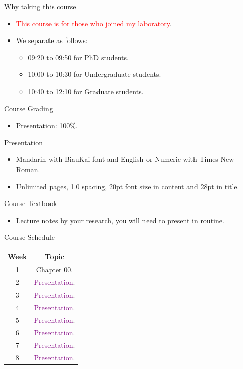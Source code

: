 \documentclass{beamer}
\begin{document}
\begin{frame}{Why taking this course}
\begin{itemize}
\item \textcolor{red}{This course is for those who joined my laboratory}.
\item We separate as follows:
\begin{itemize}
\item 09:20 to 09:50 for PhD students.
\item 10:00 to 10:30 for Undergraduate students.
\item 10:40 to 12:10 for Graduate students.
\end{itemize}
\end{itemize}
\end{frame}
\begin{frame}{Course Grading}
\begin{itemize}
\item Presentation: 100\%.
\end{itemize}
\end{frame}
\begin{frame}{Presentation}
\begin{itemize}
\item Mandarin with BiauKai font and English or Numeric with Times New Roman.
\item Unlimited pages, 1.0 spacing, 20pt font size in content and 28pt in title.
\end{itemize}
\end{frame}
\begin{frame}{Course Textbook}
\begin{itemize}
\item Lecture notes by your research, you will need to present in routine.
\end{itemize}
\end{frame}
\begin{frame}{Course Schedule}
\begin{center}
\begin{tabular}{|c|c|}
\hline
Week & Topic \\
\hline
1 & Chapter 00.\\
\hline
2 & \textcolor{purple}{Presentation}.\\
\hline
3 & \textcolor{purple}{Presentation}.\\
\hline
4 & \textcolor{purple}{Presentation}.\\
\hline
5 & \textcolor{purple}{Presentation}.\\
\hline
6 & \textcolor{purple}{Presentation}.\\
\hline
7 & \textcolor{purple}{Presentation}.\\
\hline
8 & \textcolor{purple}{Presentation}.\\
\hline
\end{tabular}
\end{center}
\end{frame}
\end{document}
